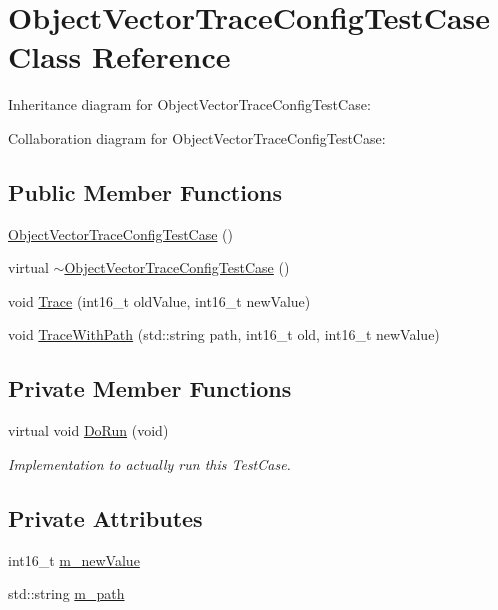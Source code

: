 \hypertarget{classObjectVectorTraceConfigTestCase}{}\section{Object\+Vector\+Trace\+Config\+Test\+Case Class Reference}
\label{classObjectVectorTraceConfigTestCase}


Inheritance diagram for Object\+Vector\+Trace\+Config\+Test\+Case\+:


Collaboration diagram for Object\+Vector\+Trace\+Config\+Test\+Case\+:
\subsection*{Public Member Functions}
\begin{DoxyCompactItemize}
\item 
\hyperlink{classObjectVectorTraceConfigTestCase_a360773ef5e50faabdbac1eb5576cb57a}{Object\+Vector\+Trace\+Config\+Test\+Case} ()
\item 
virtual \hyperlink{classObjectVectorTraceConfigTestCase_ae763a02f3235a970cfd3f56eaad5c282}{$\sim$\+Object\+Vector\+Trace\+Config\+Test\+Case} ()
\item 
void \hyperlink{classObjectVectorTraceConfigTestCase_a53ffa913f088d92e66612308f6b505da}{Trace} (int16\+\_\+t old\+Value, int16\+\_\+t new\+Value)
\item 
void \hyperlink{classObjectVectorTraceConfigTestCase_ada1f9e79bf60cc41b23aa5dc9f7d7e01}{Trace\+With\+Path} (std\+::string path, int16\+\_\+t old, int16\+\_\+t new\+Value)
\end{DoxyCompactItemize}
\subsection*{Private Member Functions}
\begin{DoxyCompactItemize}
\item 
virtual void \hyperlink{classObjectVectorTraceConfigTestCase_a9a6e89be5025970a01de8e4fb514b750}{Do\+Run} (void)
\begin{DoxyCompactList}\small\item\em Implementation to actually run this Test\+Case. \end{DoxyCompactList}\end{DoxyCompactItemize}
\subsection*{Private Attributes}
\begin{DoxyCompactItemize}
\item 
int16\+\_\+t \hyperlink{classObjectVectorTraceConfigTestCase_aa09d9661bd785bbeb9db030419138e5f}{m\+\_\+new\+Value}
\item 
std\+::string \hyperlink{classObjectVectorTraceConfigTestCase_ab52e8b427f81671e823abbbda41dea69}{m\+\_\+path}
\end{DoxyCompactItemize}
